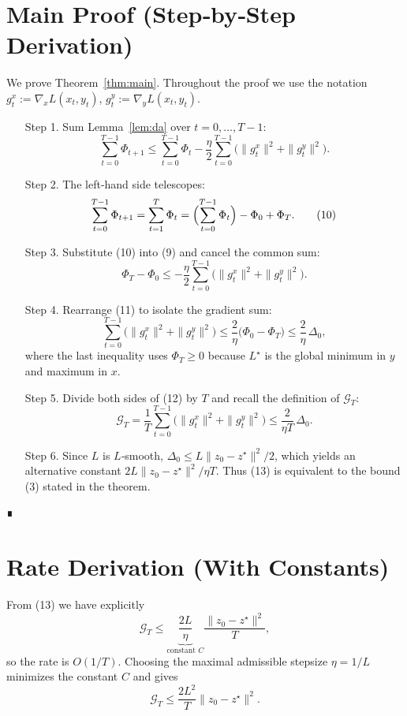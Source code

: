 \documentclass{article}
\begin{document}
\section*{Main Proof (Step‑by‑Step Derivation)}
We prove Theorem~\ref{thm:main}.  Throughout the proof we use the notation
$g_t^x:=\nabla_x L(x_t,y_t)$, $g_t^y:=\nabla_y L(x_t,y_t)$.

\begin{enumerate}
\item[Step 1.]  Sum Lemma~\ref{lem:da} over $t=0,\dots,T-1$:
\[
\sum_{t=0}^{T-1}\Phi_{t+1}
\le \sum_{t=0}^{T-1}\Phi_t
   -\frac{\eta}{2}\sum_{t=0}^{T-1}
    \bigl(\|g_t^x\|^{2}+\|g_t^y\|^{2}\bigr).
\tag{9}
\]

\item[Step 2.]  The left‑hand side telescopes:
\[
\sum_{t=0}^{T-1}\Phi_{t+1}
= \sum_{t=1}^{T}\Phi_{t}
= \Bigl(\sum_{t=0}^{T-1}\Phi_{t}\Bigr)-\Phi_0+\Phi_T .
\tag{10}
\]

\item[Step 3.]  Substitute (10) into (9) and cancel the common sum:
\[
\Phi_T - \Phi_0
\le -\frac{\eta}{2}\sum_{t=0}^{T-1}
    \bigl(\|g_t^x\|^{2}+\|g_t^y\|^{2}\bigr).
\tag{11}
\]

\item[Step 4.]  Rearrange (11) to isolate the gradient sum:
\[
\sum_{t=0}^{T-1}
    \bigl(\|g_t^x\|^{2}+\|g_t^y\|^{2}\bigr)
\le \frac{2}{\eta}\bigl(\Phi_0-\Phi_T\bigr)
\le \frac{2}{\eta}\,\Delta_0,
\tag{12}
\]
where the last inequality uses $\Phi_T\ge0$ because $L^{\star}$ is the global
minimum in $y$ and maximum in $x$.

\item[Step 5.]  Divide both sides of (12) by $T$ and recall the definition of
$\mathcal{G}_T$:
\[
\mathcal{G}_T
= \frac{1}{T}\sum_{t=0}^{T-1}
    \bigl(\|g_t^x\|^{2}+\|g_t^y\|^{2}\bigr)
\le \frac{2}{\eta T}\,\Delta_0 .
\tag{13}
\]

\item[Step 6.]  Since $L$ is $L$‑smooth, $\Delta_0\le L\|z_0-z^{\star}\|^{2}/2$,
which yields an alternative constant $2L\|z_0-z^{\star}\|^{2}/\eta T$.
Thus (13) is equivalent to the bound (3) stated in the theorem.
\end{enumerate}
∎

\section*{Rate Derivation (With Constants)}
From (13) we have explicitly
\[
\mathcal{G}_T \le \underbrace{\frac{2L}{\eta}}_{\text{constant }C}
               \frac{\|z_0-z^{\star}\|^{2}}{T},
\]
so the rate is $O(1/T)$.  Choosing the maximal admissible stepsize
$\eta = 1/L$ minimizes the constant $C$ and gives
\[
\mathcal{G}_T \le \frac{2L^{2}}{T}\|z_0-z^{\star}\|^{2}.
\]
\end{document}
